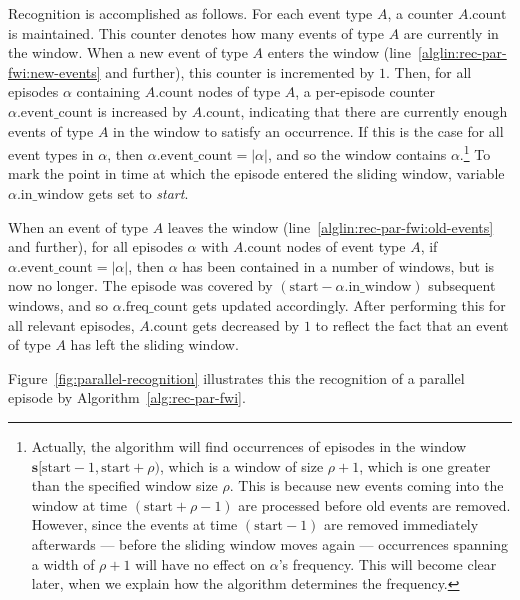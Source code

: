 Recognition is accomplished as follows. For each event type $ A $, a counter $ A \text{.count} $ is maintained. This counter denotes how many events of type $ A $ are currently in the window. When a new event of type $ A $ enters the window (line~\ref{alglin:rec-par-fwi:new-events} and further), this counter is incremented by $ 1 $. Then, for all episodes $ \alpha $ containing $ A \text{.count} $ nodes of type $ A $, a per-episode counter $ \alpha \text{.event\_count} $ is increased by $ A \text{.count} $, indicating that there are currently enough events of type $ A $ in the window to satisfy an occurrence. If this is the case for all event types in $ \alpha $, then $ \alpha \text{.event\_count} = | \alpha | $, and so the window contains $ \alpha $.\footnote{\label{footnote:false-recognition}Actually, the algorithm will find occurrences of episodes in the window $ \boldsymbol{s}[\text{start} - 1, \text{start} + \rho) $, which is a window of size $ \rho + 1 $, which is one greater than the specified window size $ \rho $. This is because new events coming into the window at time $ (\text{start} + \rho - 1) $ are processed before old events are removed. However, since the events at time $ (\text{start} - 1) $ are removed immediately afterwards --- before the sliding window moves again --- occurrences spanning a width of $ \rho + 1 $ will have no effect on $ \alpha $'s frequency. This will become clear later, when we explain how the algorithm determines the frequency.} To mark the point in time at which the episode entered the sliding window, variable $ \alpha \text{.in\_window} $ gets set to \emph{start}.

When an event of type $ A $ leaves the window (line~\ref{alglin:rec-par-fwi:old-events} and further), for all episodes $ \alpha $ with $ A \text{.count} $ nodes of event type $ A $, if $ \alpha \text{.event\_count} = | \alpha | $, then $ \alpha $ has been contained in a number of windows, but is now no longer. The episode was covered by $ (\text{start} - \alpha \text{.in\_window}) $ subsequent windows, and so $ \alpha \text{.freq\_count} $ gets updated accordingly. After performing this for all relevant episodes, $ A \text{.count} $ gets decreased by $ 1 $ to reflect the fact that an event of type $ A $ has left the sliding window.

Figure~\ref{fig:parallel-recognition} illustrates this the recognition of a parallel episode by Algorithm~\ref{alg:rec-par-fwi}.

